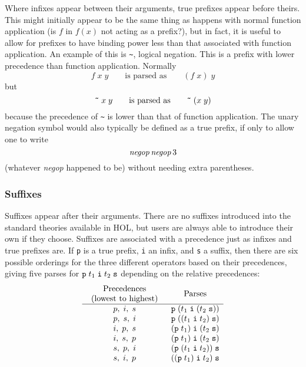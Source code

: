{Where infixes appear between their arguments, true prefixes appear
before theirs.  This might initially appear to be the same thing as
happens with normal function application (is $f$ in $f(x)$ not acting
as a prefix?), but in fact, it is useful to allow for prefixes to have
binding power less than that associated with function application.  An
example of this is \verb+~+, logical negation.  This is a prefix with
lower precedence than function application.  Normally
\[
   f\;x\; y\qquad \mbox{is parsed as}\qquad (f\; x)\; y
\] but \[
  \mbox{\tt \~{}}\; x\; y\qquad\mbox{is parsed as}\qquad
  \mbox{\tt \~{}}\; (x\; y)
\] because the precedence of \verb+~+ is lower than that of function
application.  The unary negation symbol would also typically be
defined as a true prefix, if only to allow one to write \[ {\it
  negop}\,{\it negop}\,3
\] (whatever {\it negop} happened to be) without needing extra parentheses.

\subsubsection{Suffixes}

Suffixes appear after their arguments.  There are no suffixes
introduced into the standard theories available in HOL, but users are
always able to introduce their own if they choose.  Suffixes are
associated with a precedence just as infixes and true prefixes are.
If \verb+p+ is a true prefix, \verb+i+ an infix, and \verb+s+ a
suffix, then there are six possible orderings for the three different
operators based on their precedences, giving five parses for
$\verb+p+\; t_1\; \verb+i+\; t_2\; \verb+s+$ depending on the relative
precedences:
\[
\begin{array}{cl}
\mbox{\begin{tabular}{c}Precedences\\(lowest to highest)\end{tabular}} &
\multicolumn{1}{c}{\mbox{Parses}}\\
\hline
p,\;i,\;s & \verb+p+\;(t_1\;\verb+i+\;(t_2\;\verb+s+))\\
p,\;s,\;i & \verb+p+\;((t_1\;\verb+i+\;t_2)\;\verb+s+)\\
i,\;p,\;s & (\verb+p+\;t_1)\;\verb+i+\;(t_2\;\verb+s+)\\
i,\;s,\;p & (\verb+p+\;t_1)\;\verb+i+\;(t_2\;\verb+s+)\\
s,\;p,\;i & (\verb+p+\;(t_1\;\verb+i+\;t_2))\;\verb+s+\\
s,\;i,\;p & ((\verb+p+\;t_1)\;\verb+i+\;t_2)\;\verb+s+\\
\end{array}
\]

}
